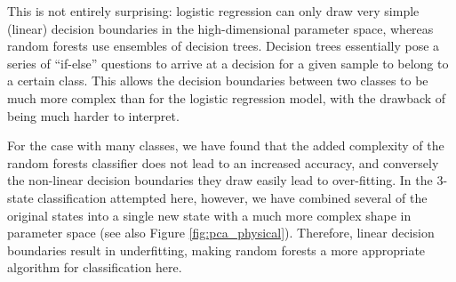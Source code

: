 \documentclass[12pt]{emulateapj}
\begin{document}
This is not entirely surprising: logistic regression can only draw very simple (linear) decision boundaries in the high-dimensional parameter space, whereas random forests use ensembles of decision trees. Decision trees essentially pose a series of ``if-else'' questions to arrive at a decision for a given sample to belong to a certain class. This allows the decision boundaries between two classes to be much more complex than for the logistic regression model, with the drawback of being much harder to interpret.

 For the case with many classes, we have found that the added complexity of the random forests classifier does not lead to an increased accuracy, and conversely the non-linear decision boundaries they draw easily lead to over-fitting. In the 3-state classification attempted here, however, we have combined several of the original states into a single new state with a much more complex shape in parameter space (see also Figure \ref{fig:pca_physical}). Therefore, linear decision boundaries result in underfitting, making random forests a more appropriate algorithm for classification here. 
\end{document}
